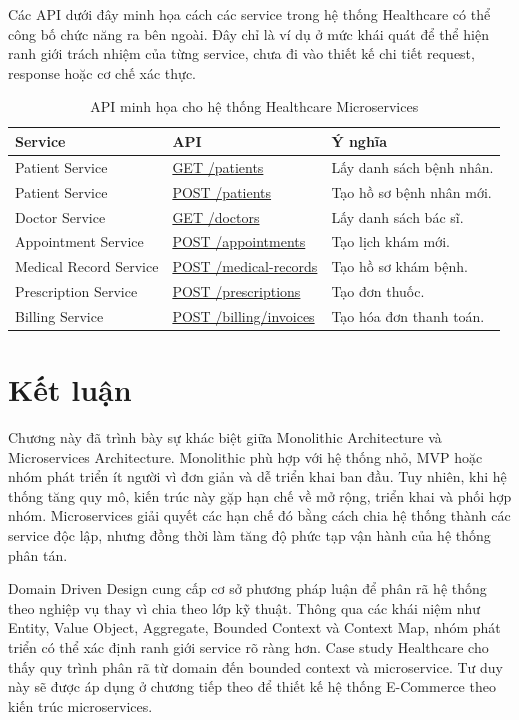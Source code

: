 \documentclass[../main.tex]{subfiles}
\begin{document}
Các API dưới đây minh họa cách các service trong hệ thống Healthcare có thể công bố chức năng ra bên ngoài. Đây chỉ là ví dụ ở mức khái quát để thể hiện ranh giới trách nhiệm của từng service, chưa đi vào thiết kế chi tiết request, response hoặc cơ chế xác thực.

\begin{table}[H]
    \centering
    \caption{API minh họa cho hệ thống Healthcare Microservices}
    \label{tab:chapter1_healthcare_api}
    \small
    \begin{tabular}{|p{}|p{}|p{}|}
        \hline
        \rowcolor{primary!35}
        \textbf{Service} & \textbf{API} & \textbf{Ý nghĩa} \\
        \hline
        Patient Service & \url{GET /patients} & Lấy danh sách bệnh nhân. \\
        \hline
        Patient Service & \url{POST /patients} & Tạo hồ sơ bệnh nhân mới. \\
        \hline
        Doctor Service & \url{GET /doctors} & Lấy danh sách bác sĩ. \\
        \hline
        Appointment Service & \url{POST /appointments} & Tạo lịch khám mới. \\
        \hline
        Medical Record Service & \url{POST /medical-records} & Tạo hồ sơ khám bệnh. \\
        \hline
        Prescription Service & \url{POST /prescriptions} & Tạo đơn thuốc. \\
        \hline
        Billing Service & \url{POST /billing/invoices} & Tạo hóa đơn thanh toán. \\
        \hline
    \end{tabular}
\end{table}

\section{Kết luận}

Chương này đã trình bày sự khác biệt giữa Monolithic Architecture và Microservices Architecture. Monolithic phù hợp với hệ thống nhỏ, MVP hoặc nhóm phát triển ít người vì đơn giản và dễ triển khai ban đầu. Tuy nhiên, khi hệ thống tăng quy mô, kiến trúc này gặp hạn chế về mở rộng, triển khai và phối hợp nhóm. Microservices giải quyết các hạn chế đó bằng cách chia hệ thống thành các service độc lập, nhưng đồng thời làm tăng độ phức tạp vận hành của hệ thống phân tán.

Domain Driven Design cung cấp cơ sở phương pháp luận để phân rã hệ thống theo nghiệp vụ thay vì chia theo lớp kỹ thuật. Thông qua các khái niệm như Entity, Value Object, Aggregate, Bounded Context và Context Map, nhóm phát triển có thể xác định ranh giới service rõ ràng hơn. Case study Healthcare cho thấy quy trình phân rã từ domain đến bounded context và microservice. Tư duy này sẽ được áp dụng ở chương tiếp theo để thiết kế hệ thống E-Commerce theo kiến trúc microservices.
\end{document}
